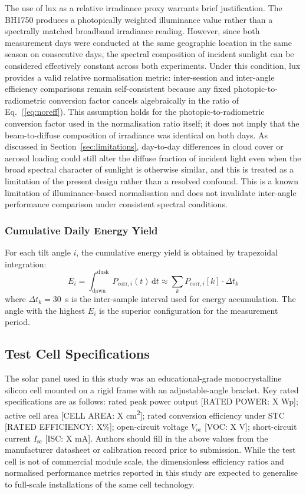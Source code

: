 \documentclass[conference]{IEEEtran}
\begin{document}
The use of lux as a relative irradiance proxy warrants brief justification. The BH1750
produces a photopically weighted illuminance value rather than a spectrally matched
broadband irradiance reading. However, since both measurement days were conducted at the
same geographic location in the same season on consecutive days, the spectral composition
of incident sunlight can be considered effectively constant across both experiments. Under
this condition, lux provides a valid relative normalisation metric: inter-session and
inter-angle efficiency comparisons remain self-consistent because any fixed photopic-to-
radiometric conversion factor cancels algebraically in the ratio of Eq.~(\ref{eq:noreff}).
This assumption holds for the photopic-to-radiometric conversion factor used in the
normalisation ratio itself; it does not imply that the beam-to-diffuse composition of
irradiance was identical on both days. As discussed in Section~\ref{sec:limitations},
day-to-day differences in cloud cover or aerosol loading could still alter the diffuse
fraction of incident light even when the broad spectral character of sunlight is otherwise
similar, and this is treated as a limitation of the present design rather than a resolved
confound.
This is a known limitation of illuminance-based normalisation \cite{duffie2013} and does
not invalidate inter-angle performance comparison under consistent spectral conditions.

\subsubsection{Cumulative Daily Energy Yield}
For each tilt angle $i$, the cumulative energy yield is obtained by trapezoidal integration:
\begin{equation}
  E_i = \int_{\text{dawn}}^{\text{dusk}} P_{\text{corr},i}(t)\,\mathrm{d}t
  \approx \sum_{k} P_{\text{corr},i}[k] \cdot \Delta t_k
  \label{eq:energy}
\end{equation}
where $\Delta t_k = 30$~s is the inter-sample interval used for energy accumulation. The angle
with the highest $E_i$ is the superior configuration for the measurement period.

\subsection{Test Cell Specifications}

The solar panel used in this study was an educational-grade monocrystalline silicon cell
mounted on a rigid frame with an adjustable-angle bracket. Key rated specifications are
as follows: rated peak power output [RATED POWER: X Wp]; active cell area [CELL AREA:
X cm\textsuperscript{2}]; rated conversion efficiency under STC [RATED EFFICIENCY: X\%];
open-circuit voltage $V_{\text{oc}}$ [VOC: X V]; short-circuit current $I_{\text{sc}}$
[ISC: X mA]. Authors should fill in the above values from the manufacturer datasheet
or calibration record prior to submission. While the test cell is not of commercial module
scale, the dimensionless efficiency ratios and normalised performance metrics reported
in this study are expected to generalise to full-scale installations of the same
cell technology.
\end{document}
